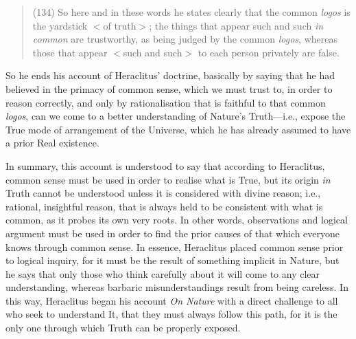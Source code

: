 \begin{quotation}
(134) So here and in these words he states clearly that the common \textit{logos} is the yardstick $<$of truth$>$; the things that appear such and such \textit{in common} are trustworthy, as being judged by the common \textit{logos}, whereas those that appear $<$such and such$>$ to each person privately are false.
\end{quotation}
So he ends his account of Heraclitus' doctrine, basically by saying that he had believed in the primacy of common sense, which we must trust to, in order to reason correctly, and only by rationalisation that is faithful to that common \textit{logos}, can we come to a better understanding of Nature's Truth---i.e., expose the True mode of arrangement of the Universe, which he has already assumed to have a prior Real existence.

In summary, this account is understood to say that according to Heraclitus, common sense must be used in order to realise what is True, but its origin \textit{in} Truth cannot be understood unless it is considered with divine reason; i.e., rational, insightful reason, that is always held to be consistent with what is common, as it probes its own very roots. In other words, observations and logical argument must be used in order to find the prior causes of that which everyone knows through common sense. In essence, Heraclitus placed common sense prior to logical inquiry, for it must be the result of something implicit in Nature, but he says that only those who think carefully about it will come to any clear understanding, whereas barbaric misunderstandings result from being careless. In this way, Heraclitus began his account \textit{On Nature} with a direct challenge to all who seek to understand It, that they must always follow this path, for it is the only one through which Truth can be properly exposed.


